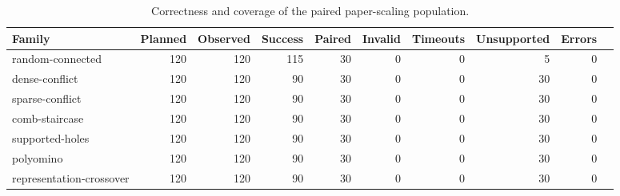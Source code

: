 \begin{table}[t]
\caption{Correctness and coverage of the paired paper-scaling population.}
\label{tab:paper-scaling-coverage}
\begin{tabular}{lrrrrrrrrr}
\toprule
Family & Planned & Observed & Success & Paired & Invalid & Timeouts & Unsupported & Errors \\
\midrule
random-connected & 120 & 120 & 115 & 30 & 0 & 0 & 5 & 0 \\
dense-conflict & 120 & 120 & 90 & 30 & 0 & 0 & 30 & 0 \\
sparse-conflict & 120 & 120 & 90 & 30 & 0 & 0 & 30 & 0 \\
comb-staircase & 120 & 120 & 90 & 30 & 0 & 0 & 30 & 0 \\
supported-holes & 120 & 120 & 90 & 30 & 0 & 0 & 30 & 0 \\
polyomino & 120 & 120 & 90 & 30 & 0 & 0 & 30 & 0 \\
representation-crossover & 120 & 120 & 90 & 30 & 0 & 0 & 30 & 0 \\
\bottomrule
\end{tabular}
\end{table}

